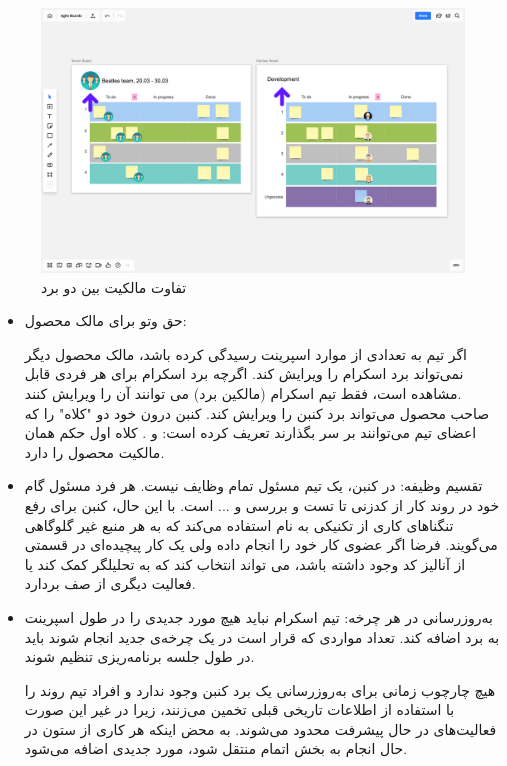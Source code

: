 {\begin{figure}
	\centering
	\includegraphics[scale=0.3]{figs/4-2-b}
	\caption{تفاوت مالکیت بین دو برد}
\end{figure}


\begin{itemize}

\item حق وتو برای مالک محصول:

اگر تیم به تعدادی از موارد اسپرینت رسیدگی کرده باشد، مالک محصول دیگر نمی‌تواند برد اسکرام را ویرایش کند. اگرچه برد اسکرام برای هر فردی قابل مشاهده است، فقط تیم اسکرام (مالکین برد) می توانند آن را ویرایش کنند.
\\
صاحب محصول می‌تواند برد کنبن را ویرایش کند. کنبن درون خود دو "کلاه" را که اعضای تیم می‌توانند بر سر بگذارند تعریف کرده است:  و . کلاه اول حکم همان مالکیت محصول را دارد.

\item تقسیم وظیفه:
در کنبن، یک تیم مسئول تمام وظایف نیست. هر فرد مسئول گام خود در روند کار از کدزنی تا تست و بررسی و ... است. با این حال، کنبن برای رفع تنگنا‌های کاری از تکنیکی به نام  استفاده می‌کند که به هر منبع غیر گلوگاهی می‌گویند. فرضا اگر عضوی کار خود را انجام داده ولی یک کار پیچیده‌ای در قسمتی از آنالیز کد وجود داشته باشد، می تواند انتخاب کند که به تحلیلگر کمک کند یا فعالیت دیگری از صف بردارد.
\item به‌روزرسانی در هر چرخه:
تیم اسکرام نباید هیچ مورد جدیدی را در طول اسپرینت به برد اضافه کند. تعداد مواردی که قرار است در یک چرخه‌ی جدید انجام شوند باید در طول جلسه برنامه‌ریزی تنظیم شوند.

هیچ چارچوب زمانی برای به‌روزرسانی یک برد کنبن وجود ندارد و افراد تیم روند را با استفاده از اطلاعات تاریخی قبلی تخمین می‌زنند، زیرا در غیر این صورت فعالیت‌های در حال پیشرفت محدود می‌شوند. به محض اینکه هر کاری از ستون در حال انجام به بخش اتمام منتقل شود، مورد جدیدی اضافه می‌شود.


\end{itemize}}
